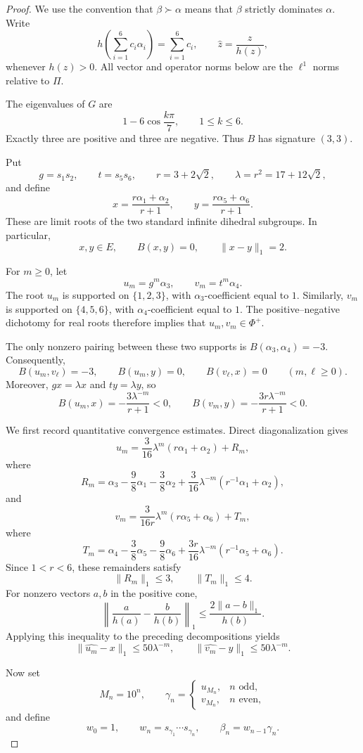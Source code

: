 \documentclass[11pt,reqno]{amsart}
\theoremstyle{plain}
\theoremstyle{definition}
\theoremstyle{remark}
\numberwithin{equation}{section}
\begin{document}
\begin{proof}
We use the convention that $\beta\succ\alpha$ means that $\beta$
strictly dominates $\alpha$. Write
\[
h\left(\sum_{i=1}^6 c_i\alpha_i\right)=\sum_{i=1}^6 c_i,
\qquad
\widehat{z}=\frac{z}{h(z)},
\]
whenever $h(z)>0$. All vector and operator norms below are the
$\ell^1$ norms relative to $\Pi$.

The eigenvalues of $G$ are
\[
1-6\cos\frac{k\pi}{7},
\qquad 1\leq k\leq6.
\]
Exactly three are positive and three are negative. Thus $B$ has
signature $(3,3)$.

Put
\[
g=s_1s_2,\qquad t=s_5s_6,\qquad
r=3+2\sqrt2,\qquad
\lambda=r^2=17+12\sqrt2,
\]
and define
\[
x=\frac{r\alpha_1+\alpha_2}{r+1},
\qquad
y=\frac{r\alpha_5+\alpha_6}{r+1}.
\]
These are limit roots of the two standard infinite dihedral
subgroups. In particular,
\[
x,y\in E,\qquad B(x,y)=0,\qquad \|x-y\|_1=2.
\]

For $m\geq0$, let
\[
u_m=g^m\alpha_3,\qquad v_m=t^m\alpha_4.
\]
The root $u_m$ is supported on $\{1,2,3\}$, with
$\alpha_3$-coefficient equal to $1$. Similarly, $v_m$ is supported
on $\{4,5,6\}$, with $\alpha_4$-coefficient equal to $1$.
The positive--negative dichotomy for real roots therefore implies
that $u_m,v_m\in\Phi^+$.

The only nonzero pairing between these two supports is
$B(\alpha_3,\alpha_4)=-3$. Consequently,
\[
B(u_m,v_\ell)=-3,\qquad
B(u_m,y)=0,\qquad B(v_\ell,x)=0
\qquad(m,\ell\geq0).
\tag{1}
\]
Moreover, $gx=\lambda x$ and $ty=\lambda y$, so
\[
B(u_m,x)=-\frac{3\lambda^{-m}}{r+1}<0,
\qquad
B(v_m,y)=-\frac{3r\lambda^{-m}}{r+1}<0.
\tag{2}
\]

We first record quantitative convergence estimates. Direct
diagonalization gives
\[
u_m=\frac{3}{16}\lambda^m(r\alpha_1+\alpha_2)+R_m,
\]
where
\[
R_m=
\alpha_3-\frac98\alpha_1-\frac38\alpha_2
+\frac{3}{16}\lambda^{-m}(r^{-1}\alpha_1+\alpha_2),
\]
and
\[
v_m=\frac{3}{16r}\lambda^m(r\alpha_5+\alpha_6)+T_m,
\]
where
\[
T_m=
\alpha_4-\frac38\alpha_5-\frac98\alpha_6
+\frac{3r}{16}\lambda^{-m}(r^{-1}\alpha_5+\alpha_6).
\]
Since $1<r<6$, these remainders satisfy
\[
\|R_m\|_1\leq3,\qquad \|T_m\|_1\leq4.
\]
For nonzero vectors $a,b$ in the positive cone,
\[
\left\|\frac{a}{h(a)}-\frac{b}{h(b)}\right\|_1
\leq\frac{2\|a-b\|_1}{h(b)}.
\]
Applying this inequality to the preceding decompositions yields
\[
\|\widehat{u_m}-x\|_1\leq50\lambda^{-m},
\qquad
\|\widehat{v_m}-y\|_1\leq50\lambda^{-m}.
\tag{3}
\]

Now set
\[
M_n=10^n,\qquad
\gamma_n=
\begin{cases}
u_{M_n},& n\text{ odd},\\
v_{M_n},& n\text{ even},
\end{cases}
\]
and define
\[
w_0=1,\qquad
w_n=s_{\gamma_1}\cdots s_{\gamma_n},
\qquad
\beta_n=w_{n-1}\gamma_n.
\tag{4}
\]


\end{proof}
\end{document}
